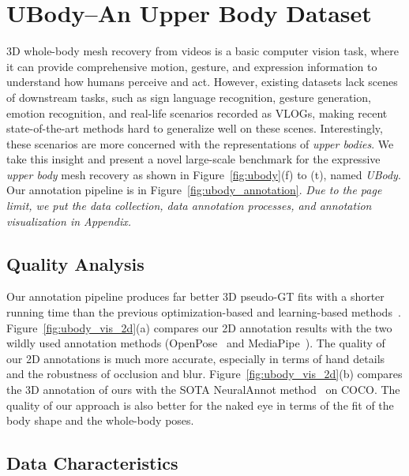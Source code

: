 \documentclass[10pt,twocolumn,letterpaper]{article}
\newcommand{\dataname}{\emph{UBody}\xspace}
\begin{document}
\section{UBody--An Upper Body Dataset}
\label{sec:ubody}


3D whole-body mesh recovery from videos is a basic computer vision task, where it can provide comprehensive motion, gesture, and expression information to understand how humans perceive and act.
However, existing datasets lack scenes of downstream tasks, such as sign language recognition, gesture generation, emotion recognition, and real-life scenarios recorded as VLOGs, making recent state-of-the-art methods hard to generalize well on these scenes.
Interestingly, these scenarios are more concerned with the representations of \emph{upper bodies}.
We take this insight and present a novel large-scale benchmark for the expressive \emph{upper body} mesh recovery as shown in Figure~\ref{fig:ubody}(f) to (t), named \dataname. Our annotation pipeline is in Figure~\ref{fig:ubody_annotation}.
\emph{Due to the page limit, we put the data collection, data annotation processes, and annotation visualization in Appendix.} 

\subsection{Quality Analysis}
\label{sec:ubody_quality}

Our annotation pipeline produces far better 3D pseudo-GT fits with a shorter running time than the previous optimization-based and learning-based methods~\cite{HanbyulJoo2022eft,Feng_2021_pixie,Pavlakos_2019smplx,Moon_2022NeuralAnnot,pavlakos2022multishot}.
Figure~\ref{fig:ubody_vis_2d}(a) compares our 2D annotation results with the two wildly used annotation methods (OpenPose~\cite{ZheCao2018OpenPoseRM} and MediaPipe~\cite{FanZhang2020MediaPipeHO}). The quality of our 2D annotations is much more accurate, especially in terms of hand details and the robustness of occlusion and blur.
Figure~\ref{fig:ubody_vis_2d}(b) compares the 3D annotation of ours with the SOTA NeuralAnnot method~\cite{Moon_2022NeuralAnnot} on COCO. The quality of our approach is also better for the naked eye in terms of the fit of the body shape and the whole-body poses.

\subsection{Data Characteristics}
\label{sec:ubody_feature}
\end{document}
